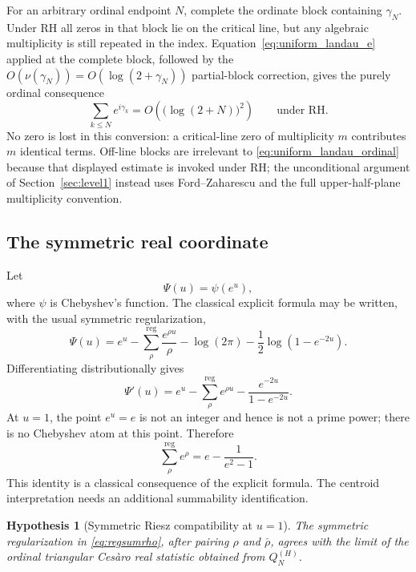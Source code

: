 \documentclass[11pt]{amsart}
\numberwithin{equation}{section}
\newtheorem{hypothesis}[theorem]{Hypothesis}
\theoremstyle{definition}
\theoremstyle{remark}
\begin{document}
For an arbitrary ordinal endpoint $N$, complete the ordinate block containing $\gamma_N$. Under RH all zeros in that block lie on the critical line, but any algebraic multiplicity is still repeated in the index. Equation~\eqref{eq:uniform_landau_e} applied at the complete block, followed by the $O(\nu(\gamma_N))=O(\log(2+\gamma_N))$ partial-block correction, gives the purely ordinal consequence
\begin{equation}\label{eq:uniform_landau_ordinal}
\sum_{k\le N}e^{i\gamma_k}=O(\bigl(\log(2+N)\bigr)^2)
\qquad\text{under RH}.
\end{equation}
No zero is lost in this conversion: a critical-line zero of multiplicity $m$ contributes $m$ identical terms. Off-line blocks are irrelevant to \eqref{eq:uniform_landau_ordinal} because that displayed estimate is invoked under RH; the unconditional argument of Section~\ref{sec:level1} instead uses Ford--Zaharescu and the full upper-half-plane multiplicity convention.

\subsection{The symmetric real coordinate}\label{subsec:symmetric_real}
Let
\[
\Psi(u)=\psi(e^u),
\]
where $\psi$ is Chebyshev's function. The classical explicit formula may be written, with the usual symmetric regularization,
\begin{equation}\label{eq:explicitPsi}
\Psi(u)=e^u-
\sum_{\rho}^{\mathrm{reg}}\frac{e^{\rho u}}{\rho}
-\log(2\pi)-\frac12\log(1-e^{-2u}).
\end{equation}
Differentiating distributionally gives
\begin{equation}\label{eq:explicitDerivative}
\Psi'(u)=e^u-
\sum_{\rho}^{\mathrm{reg}}e^{\rho u}
-\frac{e^{-2u}}{1-e^{-2u}}.
\end{equation}
At $u=1$, the point $e^u=e$ is not an integer and hence is not a prime power; there is no Chebyshev atom at this point. Therefore
\begin{equation}\label{eq:regsumrho}
\boxed{
\sum_{\rho}^{\mathrm{reg}}e^{\rho}
=e-\frac1{e^2-1}.
}
\end{equation}
This identity is a classical consequence of the explicit formula. The centroid interpretation needs an additional summability identification.

\begin{hypothesis}[Symmetric Riesz compatibility at $u=1$]\label{hyp:SR}
The symmetric regularization in \eqref{eq:regsumrho}, after pairing $\rho$ and $\bar\rho$, agrees with the limit of the ordinal triangular Cesàro real statistic obtained from $Q_N^{(H)}$.
\end{hypothesis}
\end{document}
